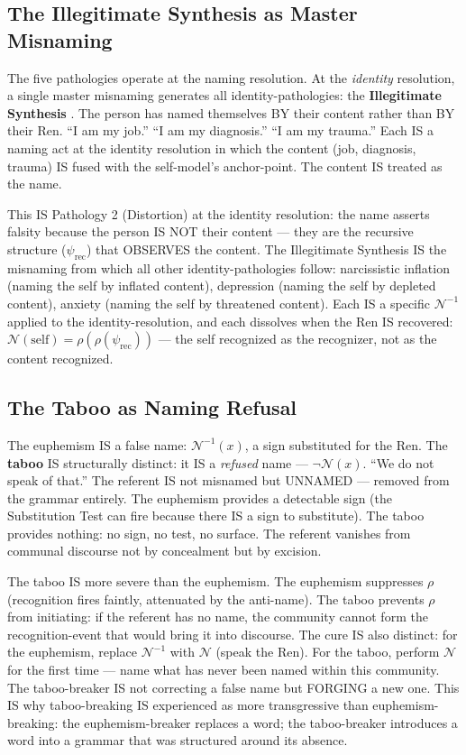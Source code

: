 \documentclass[11pt, oneside]{article}
\theoremstyle{definition}
\begin{document}
\subsection{The Illegitimate Synthesis as Master Misnaming}

The five pathologies operate at the naming resolution. At the \textit{identity} resolution, a single master misnaming generates all identity-pathologies: the \textbf{Illegitimate Synthesis} \cite{codexmentis}. The person has named themselves BY their content rather than BY their Ren. ``I am my job.'' ``I am my diagnosis.'' ``I am my trauma.'' Each IS a naming act at the identity resolution in which the content (job, diagnosis, trauma) IS fused with the self-model's anchor-point. The content IS treated as the name.

This IS Pathology 2 (Distortion) at the identity resolution: the name asserts falsity because the person IS NOT their content --- they are the recursive structure ($\psi_{\text{rec}}$) that OBSERVES the content. The Illegitimate Synthesis IS the misnaming from which all other identity-pathologies follow: narcissistic inflation (naming the self by inflated content), depression (naming the self by depleted content), anxiety (naming the self by threatened content). Each IS a specific $\mathcal{N}^{-1}$ applied to the identity-resolution, and each dissolves when the Ren IS recovered: $\mathcal{N}(\text{self}) = \rho(\rho(\psi_{\text{rec}}))$ --- the self recognized as the recognizer, not as the content recognized.

\subsection{The Taboo as Naming Refusal}

The euphemism \cite{euphemology} IS a false name: $\mathcal{N}^{-1}(x)$, a sign substituted for the Ren. The \textbf{taboo} IS structurally distinct: it IS a \textit{refused} name --- $\neg\mathcal{N}(x)$. ``We do not speak of that.'' The referent IS not misnamed but UNNAMED --- removed from the grammar entirely. The euphemism provides a detectable sign (the Substitution Test can fire because there IS a sign to substitute). The taboo provides nothing: no sign, no test, no surface. The referent vanishes from communal discourse not by concealment but by excision.

The taboo IS more severe than the euphemism. The euphemism suppresses $\rho$ (recognition fires faintly, attenuated by the anti-name). The taboo prevents $\rho$ from initiating: if the referent has no name, the community cannot form the recognition-event that would bring it into discourse. The cure IS also distinct: for the euphemism, replace $\mathcal{N}^{-1}$ with $\mathcal{N}$ (speak the Ren). For the taboo, perform $\mathcal{N}$ for the first time --- name what has never been named within this community. The taboo-breaker IS not correcting a false name but FORGING a new one. This IS why taboo-breaking IS experienced as more transgressive than euphemism-breaking: the euphemism-breaker replaces a word; the taboo-breaker introduces a word into a grammar that was structured around its absence.
\end{document}
